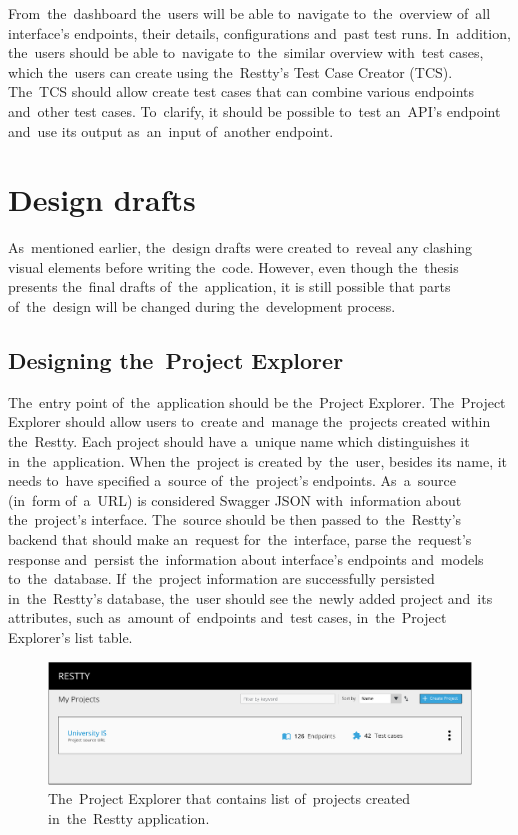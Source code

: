 From~the~dashboard the~users will be able to~navigate to~the~overview of~all
interface's endpoints, their details, configurations and~past test runs.
In~addition, the~users should be able to~navigate to~the~similar overview
with~test cases, which the~users can create using the~Restty's Test Case
Creator (TCS). The~TCS should allow create test cases that can combine various
endpoints and~other test cases. To~clarify, it should be possible to~test
an~API's endpoint and~use its output as~an~input of~another endpoint.

\section{Design drafts}
As~mentioned earlier, the~design drafts were created to~reveal any clashing visual
elements before writing the~code. However, even though the~thesis presents the~final drafts
of~the~application, it is still possible that parts of~the~design will be changed during
the~development process.

\subsection{Designing the~Project Explorer}
The~entry point of~the~application should be the~Project Explorer. The~Project
Explorer should allow users to~create and~manage the~projects created within
the~Restty. Each project should have a~unique name which distinguishes it
in~the~application. When the~project is created by~the~user, besides its name,
it needs to~have specified a~source of~the~project's endpoints. As~a~source
(in~form of~a~URL) is considered Swagger JSON with~information about
the~project's interface. The~source should be then passed to~the~Restty's
backend that should make an~request for~the~interface, parse the~request's
response and~persist the~information about interface's endpoints and~models
to~the~database. If~the~project information are successfully persisted
in~the~Restty's database, the~user should see the~newly added project and~its
attributes, such as~amount of~endpoints and~test cases, in~the~Project
Explorer's list table.

\begin{figure}[!hbt]
	\centering
	\includegraphics[scale=0.55]{./designs/project-explorer.pdf}
	\caption{The~Project Explorer that contains list of~projects created
	in~the~Restty application.}
\end{figure}

